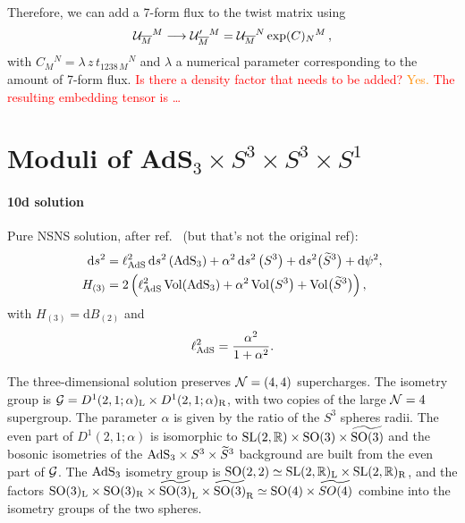\documentclass[a4paper, 11pt]{article}
\numberwithin{equation}{section}
\newcommand{\ov}[1]{\overline{#1}}
\newcommand{\SL}[1]{\mathrm{SL}( #1 )}
\newcommand{\En}[1]{E_{#1(#1)}}
\newcommand{\+}{\oplus}
\newcommand{\cU}{{\cal U}}
\newcommand{\fl}[1]{\ov{#1}}
\renewcommand{\d}{\ensuremath{\mathrm{d}}\xspace}
\newcommand{\EM}[1]{\textcolor{red}{#1}}
\newcommand{\CE}[1]{\textcolor{darkorange}{#1}}
\begin{document}
Therefore, we can add a 7-form flux to the twist matrix using
\begin{equation}
	\cU_{\fl{M}}{}^M \longrightarrow \cU'_{\fl{M}}{}^M = \cU_{\fl{M}}{}^N \exp(C)_N{}^M \,,
\end{equation}
with $C_M{}^N = \lambda\, z\, t_{1238\,M}{}^N$ and $\lambda$ a numerical parameter corresponding to the amount of 7-form flux. \EM{Is there a density factor that needs to be added?} \CE{Yes.} \EM{The resulting embedding tensor is \ldots}



\section{Moduli of \texorpdfstring{AdS$_3 \times S^3 \times S^3 \times S^1$}{AdS3xS3xS3xS1}} \label{s:Moduli}

\paragraph{10d solution}
Pure NSNS solution, after ref.~\cite{Dei:2018yth} (but that's not the original ref):
\begin{equation}
	\begin{aligned}
		\d s^{2} &= \ell_{\rm AdS}^{2}\,\d s^{2}\left({\rm AdS}_{3}\right) + \alpha^{2}\,\d s^{2}\left(S^{3}\right)+\d s^{2}\big(\widetilde{S}^{3}\big)+\d\psi^{2},\\
		H_{(3)} &= 2\left(\ell_{\rm AdS}^{2}\,{\rm Vol}({\rm AdS_{3}})+\alpha^{2}\,{\rm Vol}\big(S^{3}\big)+{\rm Vol}\big(\widetilde{S}^{3}\big)\right),
	\end{aligned}
\end{equation}
with $H_{(3)} = \d B_{(2)}$ and
\begin{equation}
	\ell_{\rm AdS}^{2} = \frac{\alpha^{2}}{1+\alpha^{2}}.
\end{equation}

The three-dimensional solution preserves ${\cal N}=(4,4)$ supercharges. The isometry group is ${\cal G}=D^{1}(2,1;\alpha)_{\rm L}\times D^{1}(2,1;\alpha)_{\rm R}$, with two copies of the large ${\cal N}=4$ supergroup. The parameter $\alpha$ is given by the ratio of the $S^{3}$ spheres radii. The even part of $D^{1}(2,1;\alpha)$ is isomorphic to ${\rm SL}(2,\mathbb{R})\times{\rm SO}(3)\times\widetilde{{\rm SO}(3)}$ and the bosonic isometries of the ${\rm AdS}_{3}\times S^{3}\times\widetilde{S}^{3}$ background are built from the even part of ${\cal G}$. The ${\rm AdS}_{3}$ isometry group is ${\rm SO}(2,2)\simeq{\rm SL}(2,\mathbb{R})_{\rm L}\times{\rm SL}(2,\mathbb{R})_{\rm R}$, and the factors ${\rm SO}(3)_{\rm L}\times{\rm SO}(3)_{\rm R}\times\widetilde{{\rm SO}(3)}_{\rm L}\times\widetilde{{\rm SO}(3)}_{\rm R}\simeq{\rm SO}(4)\times\widetilde{SO(4)}$ combine into the isometry groups of the two spheres.
\end{document}

